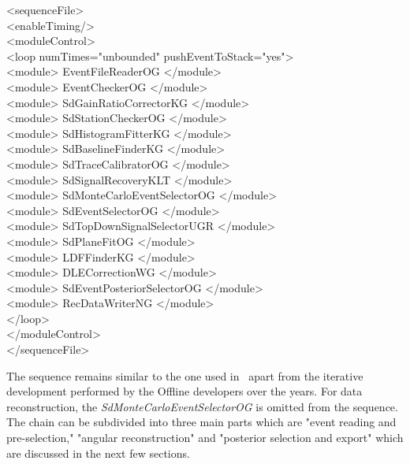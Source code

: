 \begingroup
  \selectfont <sequenceFile>\\
  \null\quad <enableTiming/>\\
  \null\quad <moduleControl>\\
  \null\qquad <loop numTimes="unbounded" pushEventToStack="yes"> \\
    \null\qquad \quad  <module> EventFileReaderOG </module>\\
    \null \qquad \quad  <module> EventCheckerOG </module>\\
    \null\qquad \quad   <module> SdGainRatioCorrectorKG </module>\\
    \null\qquad \quad   <module> SdStationCheckerOG </module>\\
    \null\qquad \quad   <module> SdHistogramFitterKG </module>\\
    \null\qquad \quad   <module> SdBaselineFinderKG </module>\\
    \null\qquad \quad   <module> SdTraceCalibratorOG </module>\\
    \null\qquad \quad   <module> SdSignalRecoveryKLT </module>\\
    \null\qquad \quad   <module> SdMonteCarloEventSelectorOG </module>\\
    \null\qquad \quad   <module> SdEventSelectorOG </module>\\
    \null\qquad \quad   <module> SdTopDownSignalSelectorUGR </module>\\
    \null\qquad \quad   <module> SdPlaneFitOG </module>\\
    \null\qquad \quad   <module> LDFFinderKG </module>\\
    \null\qquad \quad   <module> DLECorrectionWG </module>\\
    \null\qquad \quad   <module> SdEventPosteriorSelectorOG </module>\\
    \null\qquad \quad   <module> RecDataWriterNG </module>\\
  \null \qquad  </loop>\\
  \null \quad  </moduleControl>\\
  \null \quad  </sequenceFile>\\
\endgroup

The sequence remains similar to the one used in~\cite{gap_note_2013} apart from the iterative development performed by the Offline developers over the years. For data reconstruction, the \textit{SdMonteCarloEventSelectorOG} is omitted from the sequence. The chain can be subdivided into three main parts which are "event reading and pre-selection," "angular reconstruction" and "posterior selection and export" which are discussed in the next few sections.

